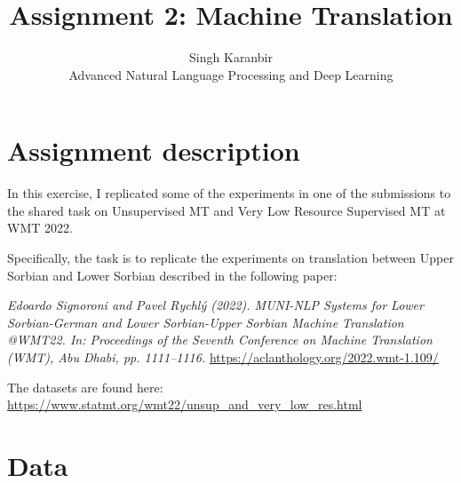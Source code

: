 \documentclass[12pt]{article}
\begin{document}
 
 
\title{Assignment 2: Machine Translation}
\author{Singh Karanbir\\ %
Advanced Natural Language Processing and Deep Learning}

\maketitle

\section*{Assignment description}
In this exercise, I replicated some of the experiments in one of the submissions to the shared task on Unsupervised MT and Very Low Resource Supervised MT at WMT 2022.

Specifically, the task is to replicate the experiments on translation between Upper Sorbian and Lower Sorbian described in the following paper:

\vspace{0.5cm}
\textit{Edoardo Signoroni and Pavel Rychlý (2022). MUNI-NLP Systems for Lower Sorbian-German and Lower Sorbian-Upper Sorbian Machine Translation @WMT22. In: Proceedings of the Seventh Conference on Machine Translation (WMT), Abu Dhabi, pp. 1111–1116.}
\href{https://aclanthology.org/2022.wmt-1.109/}{https://aclanthology.org/2022.wmt-1.109/}
\vspace{0.5cm}

The datasets are found here:
\href{https://www.statmt.org/wmt22/unsup_and_very_low_res.html}{https://www.statmt.org/wmt22/unsup\_and\_very\_low\_res.html}

\section*{Data}
\end{document}
